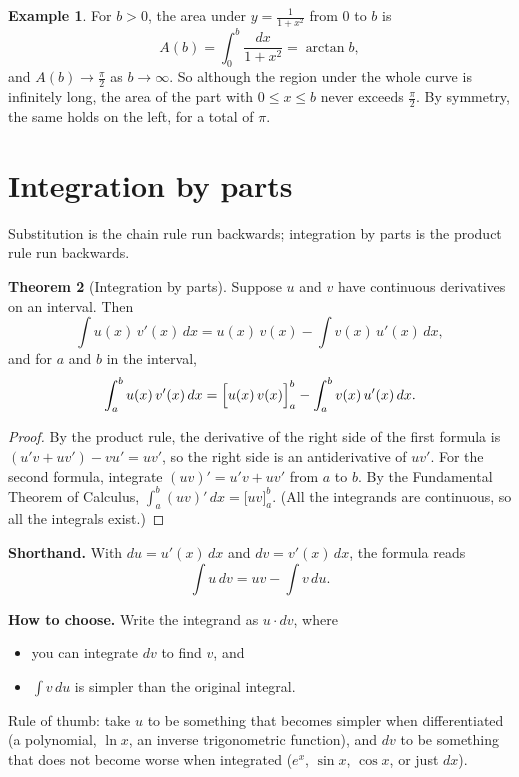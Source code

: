 \documentclass[12pt,letterpaper]{article}
\theoremstyle{definition}
\newtheorem{theorem}{Theorem}[section]
\newtheorem{example}[theorem]{Example}
\begin{document}
\begin{example}
  For $b>0$, the area under $y=\frac{1}{1+x^2}$ from $0$ to $b$ is
  \[
    A(b)=\int_0^b\frac{dx}{1+x^2}=\arctan b,
  \]
  and $A(b)\to\frac\pi2$ as $b\to\infty$. So although the region under the
  whole curve is infinitely long, the area of the part with $0\leq x\leq b$
  never exceeds $\frac\pi2$. By symmetry, the same holds on the left, for a
  total of $\pi$.
\end{example}

\section{Integration by parts}\label{sec:parts}

Substitution is the chain rule run backwards; integration by parts is the
product rule run backwards.

\begin{theorem}[Integration by parts]
  Suppose $u$ and $v$ have continuous derivatives on an interval. Then
  \[
    \int u(x)\,v'(x)\,dx=u(x)\,v(x)-\int v(x)\,u'(x)\,dx,
  \]
  and for $a$ and $b$ in the interval,
  \[
    \int_a^b u(x)\,v'(x)\,dx=\Bigl[u(x)\,v(x)\Bigr]_a^b
      -\int_a^b v(x)\,u'(x)\,dx.
  \]
\end{theorem}

\begin{proof}
  By the product rule, the derivative of the right side of the first formula
  is $(u'v+uv')-vu'=uv'$, so the right side is an antiderivative of $uv'$.
  For the second formula, integrate $(uv)'=u'v+uv'$ from $a$ to $b$. By the
  Fundamental Theorem of Calculus, $\int_a^b(uv)'\,dx=\bigl[uv\bigr]_a^b$.
  (All the integrands are continuous, so all the integrals exist.)
\end{proof}

\textbf{Shorthand.} With $du=u'(x)\,dx$ and $dv=v'(x)\,dx$, the formula reads
\[
  \boxed{\;\int u\,dv=uv-\int v\,du.\;}
\]

\textbf{How to choose.} Write the integrand as $u\cdot dv$, where
\begin{itemize}[itemsep=0.2em]
  \item you can integrate $dv$ to find $v$, and
  \item $\int v\,du$ is simpler than the original integral.
\end{itemize}
Rule of thumb: take $u$ to be something that becomes simpler when
differentiated (a polynomial, $\ln x$, an inverse trigonometric function), and
$dv$ to be something that does not become worse when integrated ($e^x$,
$\sin x$, $\cos x$, or just $dx$).
\end{document}
